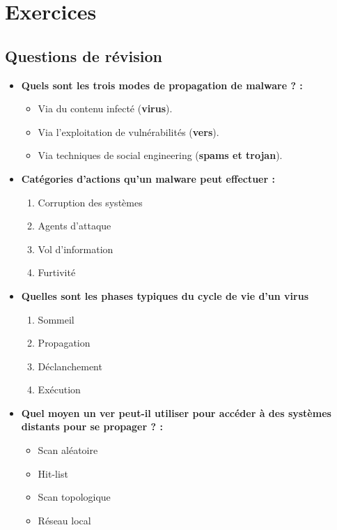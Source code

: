 \documentclass{report}
\begin{document}
	\section{Exercices}

		\subsection{Questions de révision}

			\begin{itemize}
				\item \textbf{Quels sont les trois modes de propagation de malware ? : }\\

					\begin{itemize}
						\item Via du contenu infecté (\textbf{virus}).
						\item Via l'exploitation de vulnérabilités (\textbf{vers}).
						\item Via techniques de social engineering (\textbf{spams et trojan}).
					\end{itemize}

				\item \textbf{Catégories d'actions qu'un malware peut effectuer : }

					\begin{enumerate}
						\item Corruption des systèmes
						\item Agents d'attaque
						\item Vol d'information
						\item Furtivité
					\end{enumerate}

				\item \textbf{Quelles sont les phases typiques du cycle de vie d'un virus}

					\begin{enumerate}
						\item Sommeil
						\item Propagation
						\item Déclanchement
						\item Exécution
					\end{enumerate}

				\item \textbf{Quel moyen un ver peut-il utiliser pour accéder à des systèmes distants pour se propager ? :}

					\begin{itemize}
						\item Scan aléatoire
						\item Hit-list
						\item Scan topologique
						\item Réseau local
					\end{itemize}
			\end{itemize}
\end{document}

